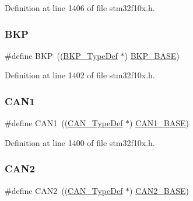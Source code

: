 Definition at line 1406 of file stm32f10x.\+h.

\mbox{\label{group___peripheral__declaration_gaa38716de06974ea948ad34ef7bfee00b}} 
\subsubsection{\texorpdfstring{B\+KP}{BKP}}
{\footnotesize\ttfamily \#define B\+KP~((\hyperlink{struct_b_k_p___type_def}{B\+K\+P\+\_\+\+Type\+Def} $\ast$) \hyperlink{group___peripheral__memory__map_gaa15d5a9f40794105397ba5ea567c4ae1}{B\+K\+P\+\_\+\+B\+A\+SE})}



Definition at line 1402 of file stm32f10x.\+h.

\mbox{\label{group___peripheral__declaration_ga4964ecb6a5c689aaf8ee2832b8093aac}} 
\subsubsection{\texorpdfstring{C\+A\+N1}{CAN1}}
{\footnotesize\ttfamily \#define C\+A\+N1~((\hyperlink{struct_c_a_n___type_def}{C\+A\+N\+\_\+\+Type\+Def} $\ast$) \hyperlink{group___peripheral__memory__map_gad8e45ea6c032d9fce1b0516fff9d8eaa}{C\+A\+N1\+\_\+\+B\+A\+SE})}



Definition at line 1400 of file stm32f10x.\+h.

\mbox{\label{group___peripheral__declaration_gac5e4c86ed487dc91418b156e24808033}} 
\subsubsection{\texorpdfstring{C\+A\+N2}{CAN2}}
{\footnotesize\ttfamily \#define C\+A\+N2~((\hyperlink{struct_c_a_n___type_def}{C\+A\+N\+\_\+\+Type\+Def} $\ast$) \hyperlink{group___peripheral__memory__map_gaf7b8267b0d439f8f3e82f86be4b9fba1}{C\+A\+N2\+\_\+\+B\+A\+SE})}



